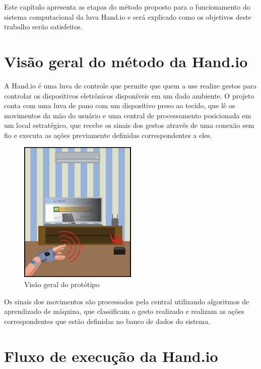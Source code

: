 \label{chapter:metodo}
Este capítulo apresenta as etapas do método proposto para o funcionamento do sistema computacional da luva Hand.io e será explicado como os objetivos deste trabalho serão satisfeitos. 

\section{Visão geral do método da Hand.io}

A Hand.io é uma luva de controle que permite que quem a use realize gestos para controlar os dispositivos eletrônicos disponíveis em um dado ambiente. O projeto conta com uma luva de pano com um dispositivo preso ao tecido, que lê os movimentos da mão do usuário e uma central de processamento posicionada em um local estratégico, que recebe os sinais dos gestos através de uma conexão sem fio e executa as ações previamente definidas correspondentes a eles.

\begin{figure}[ht]
    \centering
    \includegraphics[width=0.5\textwidth, keepaspectratio]{resources/bigpicture.jpeg}
    \caption{Visão geral do protótipo}
    \label{fig:bigpicture}
\end{figure}

Os sinais dos movimentos são processados pela central utilizando algoritmos de aprendizado de máquina, que classificam o gesto realizado e realizam as ações correspondentes que estão definidas no banco de dados do sistema.


\section{Fluxo de execução da Hand.io}

